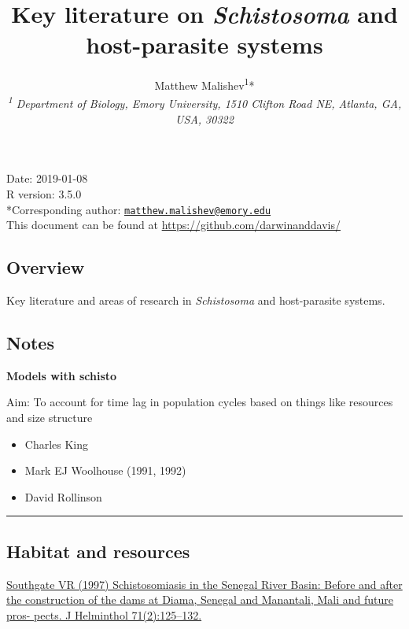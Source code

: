 \documentclass[10,portrait]{article}
\title{Key literature on \emph{Schistosoma} and host-parasite systems}
\author{Matthew
Malishev\textsuperscript{1}*\\[2\baselineskip]\emph{\textsuperscript{1}
Department of Biology, Emory University, 1510 Clifton Road NE, Atlanta,
GA, USA, 30322}}
\date{}
\providecommand{\tightlist}{%
  \setlength{\itemsep}{0pt}\setlength{\parskip}{0pt}}
\begin{document}
\maketitle

{
\hypersetup{linkcolor=black}
\setcounter{tocdepth}{3}
\tableofcontents
}
\newpage   

Date: 2019-01-08\\
R version: 3.5.0\\
*Corresponding author:
\href{mailto:matthew.malishev@emory.edu}{\nolinkurl{matthew.malishev@emory.edu}}\\
This document can be found at \url{https://github.com/darwinanddavis/}

\newpage  

\subsection{Overview}\label{overview}

Key literature and areas of research in \emph{Schistosoma} and
host-parasite systems.

\subsection{Notes}\label{notes}

\textbf{Models with schisto}

Aim: To account for time lag in population cycles based on things like
resources and size structure

\begin{itemize}
\tightlist
\item
  Charles King\\
\item
  Mark EJ Woolhouse (1991, 1992)\\
\item
  David Rollinson
\end{itemize}

\newpage  

\begin{center}\rule{0.5\linewidth}{\linethickness}\end{center}

\subsection{Habitat and resources}\label{habitat-and-resources}

\href{Southgate\%20VR\%20(1997)\%20Schistosomiasis\%20in\%20the\%20Senegal\%20River\%20Basin:\%20Before\%20and\%20after\%20the\%20construction\%20of\%20the\%20dams\%20at\%20Diama,\%20Senegal\%20and\%20Manantali,\%20Mali\%20and\%20future\%20pros-\%20pects.\%20J\%20Helminthol\%2071(2):125–132}{Southgate
VR (1997) Schistosomiasis in the Senegal River Basin: Before and after
the construction of the dams at Diama, Senegal and Manantali, Mali and
future pros- pects. J Helminthol 71(2):125--132.}
\end{document}
